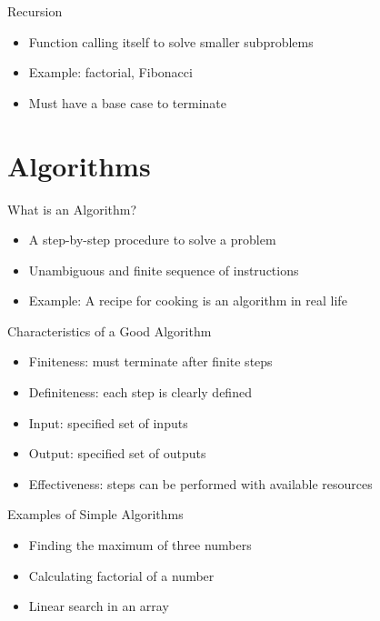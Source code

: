 \documentclass[12pt, aspectratio=169]{beamer}
\begin{document}
    \begin{frame}{Recursion}
        \begin{itemize}
            \item Function calling itself to solve smaller subproblems
            \item Example: factorial, Fibonacci
            \item Must have a base case to terminate
        \end{itemize}
    \end{frame}


    \section{Algorithms}


    \begin{frame}{What is an Algorithm?}
        \begin{itemize}
            \item A step-by-step procedure to solve a problem
            \item Unambiguous and finite sequence of instructions
            \item Example: A recipe for cooking is an algorithm in real life
        \end{itemize}
    \end{frame}


    \begin{frame}{Characteristics of a Good Algorithm}
        \begin{itemize}
            \item Finiteness: must terminate after finite steps
            \item Definiteness: each step is clearly defined
            \item Input: specified set of inputs
            \item Output: specified set of outputs
            \item Effectiveness: steps can be performed with available resources
        \end{itemize}
    \end{frame}


    \begin{frame}{Examples of Simple Algorithms}
        \begin{itemize}
            \item Finding the maximum of three numbers
            \item Calculating factorial of a number
            \item Linear search in an array
        \end{itemize}
    \end{frame}
\end{document}

